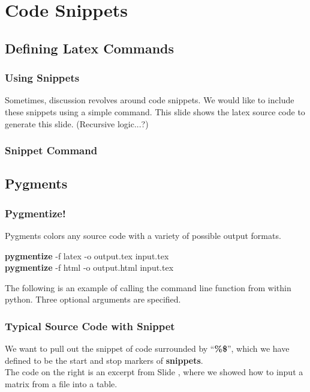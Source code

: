 \section{Code Snippets}
\begin{frame}
\tableofcontents[currentsection]
\end{frame}

\subsection{Defining Latex Commands}
\begin{frame}
\frametitle{Using Snippets}
Sometimes, discussion revolves around code 
snippets.  We would like to include these 
snippets using a simple command.
This slide shows the latex source code to
generate this slide.  (Recursive logic...?)
\end{frame}

\begin{frame}
\frametitle{Snippet Command}
\end{frame}

\subsection{Pygments}
\begin{frame}
\frametitle{Pygmentize!}
Pygments colors any source code with a variety
of possible output formats.
\begin{center}
\begin{minipage}{.6\linewidth}
\noindent
{\bf pygmentize} -f latex -o output.tex input.tex \\
\noindent
{\bf pygmentize} -f html -o output.html input.tex
\end{minipage}
\end{center}
The following is an example of calling the 
command line function from within python.  
Three optional arguments are specified.
\end{frame}

\begin{frame}[fragile]
\frametitle{Typical Source Code with Snippet}
\begin{minipage}{.35\linewidth}
We want to pull out the snippet of code
surrounded by ``{\bf \%\$}'', which we have 
defined to be the start and stop markers of
{\bf snippets}.
\\[1em]
The code on the right is an excerpt from Slide
\pageref{slide/matricesandtables}, where we 
showed how to input a matrix from a file into
a table.
\end{minipage}
\hfill
\begin{minipage}{.6\linewidth}
\begin{small}

\end{small}
\end{minipage}
\end{frame}

